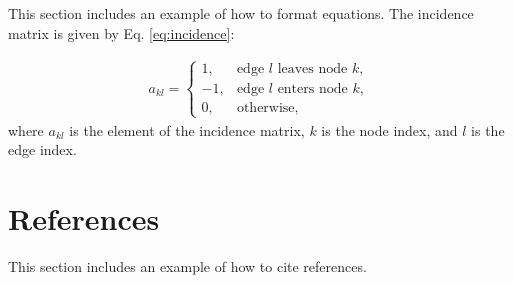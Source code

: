 \documentclass[a4paper]{book}
\begin{document}
This section includes an example of how to format equations. The incidence matrix is given by Eq. \ref{eq:incidence}:

\begin{align}\label{eq:incidence}
    a_{kl}=
    \begin{cases}
        1,  & \text{edge $l$ leaves node $k$},\\
        -1, & \text{edge $l$ enters node $k$},\\
        0,  & \text{otherwise},
    \end{cases}
\end{align}
where $a_{kl}$ is the element of the incidence matrix, $k$ is the node index, and $l$ is the edge index.

\section{References}

This section includes an example of how to cite references\cite{article1}.



\end{document}

